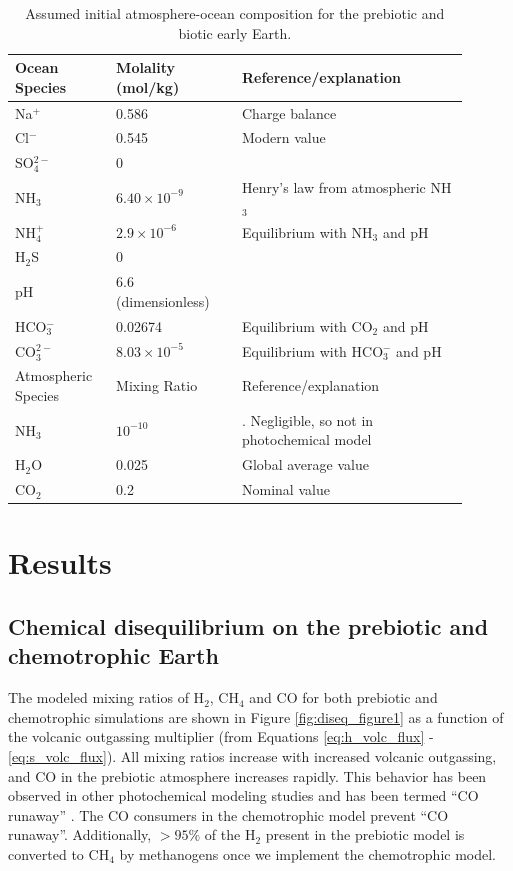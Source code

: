 \begin{table}
  \caption{Assumed initial atmosphere-ocean composition for the prebiotic and biotic early Earth.}
  \label{tab:assumed_comp}
  \begin{center}
  \begin{tabularx}{0.95\linewidth}{p{0.2\linewidth} p{0.25\linewidth} p{0.45\linewidth}}
    \hline \hline
    Ocean Species & Molality (mol/kg) & Reference/explanation \\
    \hline
    Na$^{+}$ & 0.586 & Charge balance 
    \\
    Cl$^{-}$ & 0.545 & Modern value
    \\
    SO$_4^{2-}$ & 0 & \citep{Crowe_2014}
    \\
    NH$_3$ & $6.40 \times 10^{-9}$ & Henry's law from atmospheric NH$_3$
    \\
    NH$_4^{+}$ & $2.9 \times 10^{-6}$ & Equilibrium with NH$_3$ and pH
    \\
    H$_2$S & 0 & \citep{KrissansenTotton_2018_diseq}
    \\
    pH & 6.6 (dimensionless) & \citep{KrissansenTotton_2018_carbon}
    \\
    HCO$_3^{-}$ & 0.02674 & Equilibrium with CO$_2$ and pH
    \\
    CO$_3^{2-}$ & $8.03 \times 10^{-5}$ & Equilibrium with HCO$_3^{-}$ and pH 
    \\
    \hline \hline
    Atmospheric Species & Mixing Ratio & Reference/explanation \\
    \hline
    NH$_3$ & $10^{-10}$ & \citet{Wolf_2010}. Negligible, so not in photochemical model
    \\
    H$_2$O & 0.025 & Global average value 
    \\
    CO$_2$ & 0.2 & Nominal value \citep{Kadoya_2020,KrissansenTotton_2018_carbon}
  \end{tabularx}
  \end{center}
\end{table}

\section{Results}

\subsection{Chemical disequilibrium on the prebiotic and chemotrophic Earth}

The modeled mixing ratios of H$_2$, CH$_4$ and CO for both prebiotic and chemotrophic simulations are shown in Figure \ref{fig:diseq_figure1} as a function of the volcanic outgassing multiplier (from Equations \eqref{eq:h_volc_flux} - \eqref{eq:s_volc_flux}). All mixing ratios increase with increased volcanic outgassing, and CO in the prebiotic atmosphere increases rapidly. This behavior has been observed in other photochemical modeling studies and has been termed ``CO runaway'' \citep{Kasting_1983,Zahnle_1986}. The CO consumers in the chemotrophic model prevent ``CO runaway''. Additionally, $> 95\%$ of the H$_2$ present in the prebiotic model is converted to CH$_4$ by methanogens once we implement the chemotrophic model. 

